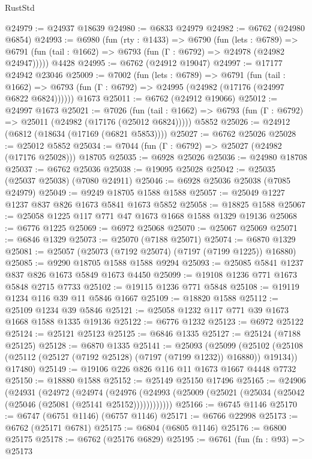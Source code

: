 \begin{lexlean}{RustStd}
\begin{coremodule}
@24979 := @24937 @18639
@24980 := @6833 @24979
@24982 := @6762 (@24980 @6854)
@24993 := @6980
    (fun (rty : @1433) =>
    @6790
      (fun (lets : @6789) =>
      @6791 (fun (tail : @1662) => @6793 (fun (Γ : @6792) => @24978 (@24982 @24947)))))
    @4428
@24995 := @6762 (@24912 @19047)
@24997 := @17177 @24942 @23046
@25009 := @7002
    (fun (lets : @6789) =>
    @6791
      (fun (tail : @1662) =>
      @6793 (fun (Γ : @6792) => @24995 (@24982 (@17176 (@24997 @6822 @6824))))))
    @1673
@25011 := @6762 (@24912 @19066)
@25012 := @24997 @1673
@25021 := @7026
    (fun (tail : @1662) => @6793 (fun (Γ : @6792) => @25011 (@24982 (@17176 (@25012 @6824)))))
    @5852
@25026 := @24912 (@6812 (@18634 (@17169 (@6821 @5853))))
@25027 := @6762 @25026
@25028 := @25012 @5852
@25034 := @7044 (fun (Γ : @6792) => @25027 (@24982 (@17176 @25028))) @18705
@25035 := @6928 @25026
@25036 := @24980 @18708
@25037 := @6762 @25036
@25038 := @19095 @25028
@25042 := @25035 (@25037 @25038) (@7080 @24911)
@25046 := @6928 @25036 @25038 (@7085 @24979)
@25049 := @9249 @18705 @1588 @1588
@25057 := @25049 @1227 @1237 @837 @826 @1673 @5841 @1673 @5852
@25058 := @18825 @1588
@25067 := @25058 @1225 @117 @771 @47 @1673 @1668 @1588 @1329 @19136
@25068 := @6776 @1225
@25069 := @6972 @25068
@25070 := @25067 @25069
@25071 := @6846 @1329
@25073 := @25070 (@7188 @25071)
@25074 := @6870 @1329
@25081 := @25057 (@25073 (@7192 @25074) (@7197 (@7199 @1225)) @16880)
@25085 := @9290 @18705 @1588 @1588 @9294
@25093 := @25085 @5841 @1237 @837 @826 @1673 @5849 @1673 @4450
@25099 := @19108 @1236 @771 @1673 @5848 @2715 @7733
@25102 := @19115 @1236 @771 @5848
@25108 := @19119 @1234 @116 @39 @11 @5846 @1667
@25109 := @18820 @1588
@25112 := @25109 @1234 @39 @5846
@25121 := @25058 @1232 @117 @771 @39 @1673 @1668 @1588 @1335 @19136
@25122 := @6776 @1232
@25123 := @6972 @25122
@25124 := @25121 @25123
@25125 := @6846 @1335
@25127 := @25124 (@7188 @25125)
@25128 := @6870 @1335
@25141 := @25093
    (@25099
      (@25102 (@25108 (@25112 (@25127 (@7192 @25128) (@7197 (@7199 @1232)) @16880)) @19134))
      @17480)
@25149 := @19106 @226 @826 @116 @11 @1673 @1667 @4448 @7732
@25150 := @18880 @1588
@25152 := @25149 @25150 @17496
@25165 := @24906
    (@24931
      (@24972
        (@24974
          (@24976 (@24993 (@25009 (@25021 (@25034 (@25042 (@25046 (@25081 (@25141 @25152))))))))))))
@25166 := @6745 @1146
@25170 := @6747 (@6751 @1146) (@6757 @1146)
@25171 := @6766 @22998
@25173 := @6762 (@25171 @6781)
@25175 := @6804 (@6805 @1146)
@25176 := @6800 @25175
@25178 := @6762 (@25176 @6829)
@25195 := @6761
    (fun (fn : @93) =>
    @25173

\end{coremodule}
\end{lexlean}
